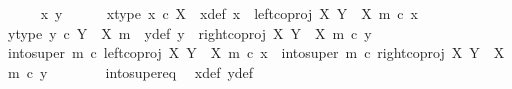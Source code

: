 \begin{isabellebody}
\isanewline
\ \ \ \ \isamarkupfalse%
\ x{\isacharprime}{\kern0pt}\ y{\isacharprime}{\kern0pt}\isanewline
\ \ \ \ \isamarkupfalse%
\ x{\isacharprime}{\kern0pt}{\isacharunderscore}{\kern0pt}type{\isacharcolon}{\kern0pt}\ {\isachardoublequoteopen}x{\isacharprime}{\kern0pt}\ {\isasymin}\isactrlsub c\ X{\isachardoublequoteclose}\ \ x{\isacharunderscore}{\kern0pt}def{\isacharcolon}{\kern0pt}\ {\isachardoublequoteopen}x\ {\isacharequal}{\kern0pt}\ left{\isacharunderscore}{\kern0pt}coproj\ X\ {\isacharparenleft}{\kern0pt}Y\ {\isasymsetminus}\ {\isacharparenleft}{\kern0pt}X{\isacharcomma}{\kern0pt}\ m{\isacharparenright}{\kern0pt}{\isacharparenright}{\kern0pt}\ {\isasymcirc}\isactrlsub c\ x{\isacharprime}{\kern0pt}{\isachardoublequoteclose}\isanewline
\ \ \ \ \isamarkupfalse%
\ y{\isacharprime}{\kern0pt}{\isacharunderscore}{\kern0pt}type{\isacharcolon}{\kern0pt}\ {\isachardoublequoteopen}y{\isacharprime}{\kern0pt}\ {\isasymin}\isactrlsub c\ Y\ {\isasymsetminus}\ {\isacharparenleft}{\kern0pt}X{\isacharcomma}{\kern0pt}\ m{\isacharparenright}{\kern0pt}{\isachardoublequoteclose}\ \ y{\isacharunderscore}{\kern0pt}def{\isacharcolon}{\kern0pt}\ {\isachardoublequoteopen}y\ {\isacharequal}{\kern0pt}\ right{\isacharunderscore}{\kern0pt}coproj\ X\ {\isacharparenleft}{\kern0pt}Y\ {\isasymsetminus}\ {\isacharparenleft}{\kern0pt}X{\isacharcomma}{\kern0pt}\ m{\isacharparenright}{\kern0pt}{\isacharparenright}{\kern0pt}\ {\isasymcirc}\isactrlsub c\ y{\isacharprime}{\kern0pt}{\isachardoublequoteclose}\isanewline
\isanewline
\ \ \ \ \isamarkupfalse%
\ {\isachardoublequoteopen}into{\isacharunderscore}{\kern0pt}super\ m\ {\isasymcirc}\isactrlsub c\ left{\isacharunderscore}{\kern0pt}coproj\ X\ {\isacharparenleft}{\kern0pt}Y\ {\isasymsetminus}\ {\isacharparenleft}{\kern0pt}X{\isacharcomma}{\kern0pt}\ m{\isacharparenright}{\kern0pt}{\isacharparenright}{\kern0pt}\ {\isasymcirc}\isactrlsub c\ x{\isacharprime}{\kern0pt}\ {\isacharequal}{\kern0pt}\ into{\isacharunderscore}{\kern0pt}super\ m\ {\isasymcirc}\isactrlsub c\ right{\isacharunderscore}{\kern0pt}coproj\ X\ {\isacharparenleft}{\kern0pt}Y\ {\isasymsetminus}\ {\isacharparenleft}{\kern0pt}X{\isacharcomma}{\kern0pt}\ m{\isacharparenright}{\kern0pt}{\isacharparenright}{\kern0pt}\ {\isasymcirc}\isactrlsub c\ y{\isacharprime}{\kern0pt}{\isachardoublequoteclose}\isanewline
\ \ \ \ \ \ \isamarkupfalse%
\ into{\isacharunderscore}{\kern0pt}super{\isacharunderscore}{\kern0pt}eq\ \isamarkupfalse%
\ x{\isacharunderscore}{\kern0pt}def\ y{\isacharunderscore}{\kern0pt}def\ \isamarkupfalse%

\end{isabellebody}
